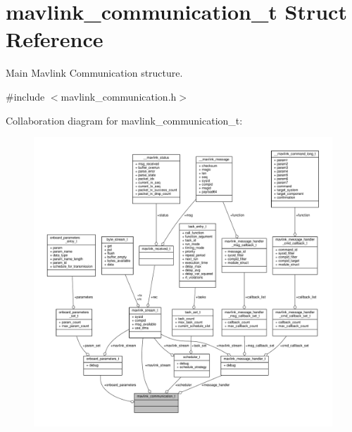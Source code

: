 \hypertarget{structmavlink__communication__t}{\section{mavlink\+\_\+communication\+\_\+t Struct Reference}
\label{structmavlink__communication__t}
}


Main Mavlink Communication structure.  




{\ttfamily \#include $<$mavlink\+\_\+communication.\+h$>$}



Collaboration diagram for mavlink\+\_\+communication\+\_\+t\+:
\nopagebreak
\begin{figure}[H]
\begin{center}
\leavevmode
\includegraphics[width=350pt]{structmavlink__communication__t__coll__graph}
\end{center}
\end{figure}
